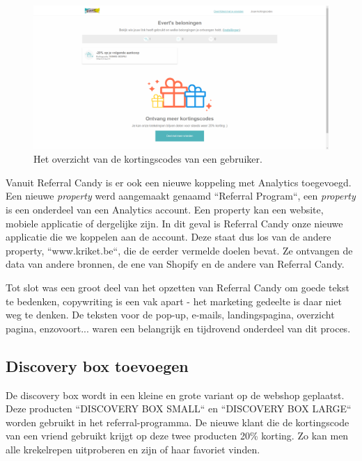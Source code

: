 \begin{figure}[h!]
	\includegraphics[width=\linewidth]{img/referral-account.png}
	\caption{Het overzicht van de kortingscodes van een gebruiker.}
	\label{fig:referral-account.png}
\end{figure}

Vanuit Referral Candy is er ook een nieuwe koppeling met Analytics toegevoegd. Een nieuwe \emph{property} werd aangemaakt genaamd ``Referral Program``, een \emph{property} is een onderdeel van een Analytics account. Een property kan een website, mobiele applicatie of dergelijke zijn. In dit geval is Referral Candy onze nieuwe applicatie die we koppelen aan de account. Deze staat dus los van de andere property, ``www.kriket.be``, die de eerder vermelde doelen bevat. Ze ontvangen de data van andere bronnen, de ene van Shopify en de andere van Referral Candy.

Tot slot was een groot deel van het opzetten van Referral Candy om goede tekst te bedenken, copywriting is een vak apart - het marketing gedeelte is daar niet weg te denken. De teksten voor de pop-up, e-mails, landingspagina, overzicht pagina, enzovoort... waren een belangrijk en tijdrovend onderdeel van dit proces. 

\subsection{Discovery box toevoegen} \label{sec:aanpassingen-webshop}
De discovery box wordt in een kleine en grote variant op de webshop geplaatst. Deze producten ``DISCOVERY BOX SMALL`` en ``DISCOVERY BOX LARGE`` worden gebruikt in het referral-programma. De nieuwe klant die de kortingscode van een vriend gebruikt krijgt op deze twee producten 20\% korting. Zo kan men alle krekelrepen uitproberen en zijn of haar favoriet vinden.

